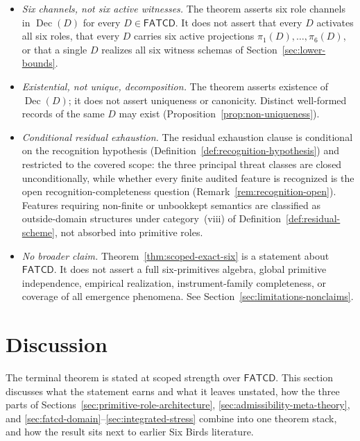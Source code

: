 \documentclass[11pt]{article}
\theoremstyle{definition}
\newcommand{\FATCD}{\ensuremath{\mathsf{FATCD}}}
\newcommand{\Dec}[1]{\ensuremath{\operatorname{Dec}\!\left(#1\right)}}
\begin{document}
\begin{itemize}[topsep=2pt,itemsep=1pt]
  \item \emph{Six channels, not six active witnesses.} The theorem
    asserts six role channels in \(\Dec{D}\) for every
    \(D \in \FATCD{}\). It does not assert that every \(D\) activates
    all six roles, that every \(D\) carries six active projections
    \(\pi_1(D), \ldots, \pi_6(D)\), or that a single \(D\) realizes
    all six witness schemas of Section~\ref{sec:lower-bounds}.
  \item \emph{Existential, not unique, decomposition.} The theorem
    asserts existence of \(\Dec{D}\); it does not assert uniqueness or
    canonicity. Distinct well-formed records of the same \(D\) may
    exist (Proposition~\ref{prop:non-uniqueness}).
  \item \emph{Conditional residual exhaustion.} The residual
    exhaustion clause is conditional on the recognition hypothesis
    (Definition~\ref{def:recognition-hypothesis}) and restricted to the
    covered scope: the three principal threat classes are closed
    unconditionally, while whether every finite audited feature is recognized
    is the open recognition-completeness question
    (Remark~\ref{rem:recognition-open}). Features requiring non-finite or
    unbookkept semantics are classified as outside-domain structures under
    category~(viii) of Definition~\ref{def:residual-scheme}, not absorbed into
    primitive roles.
  \item \emph{No broader claim.} Theorem~\ref{thm:scoped-exact-six}
    is a statement about \FATCD{}. It does not assert a full
    six-primitives algebra, global primitive independence, empirical
    realization, instrument-family completeness, or coverage of all
    emergence phenomena. See Section~\ref{sec:limitations-nonclaims}.
\end{itemize}

 \section{Discussion}\label{sec:discussion}



The terminal theorem is stated at scoped strength over \FATCD{}.
This section discusses what the statement earns and what it leaves
unstated, how the three parts of
Sections~\ref{sec:primitive-role-architecture},
\ref{sec:admissibility-meta-theory}, and
\ref{sec:fatcd-domain}--\ref{sec:integrated-stress} combine into one
theorem stack, and how the result sits next to earlier Six Birds
literature.
\end{document}
